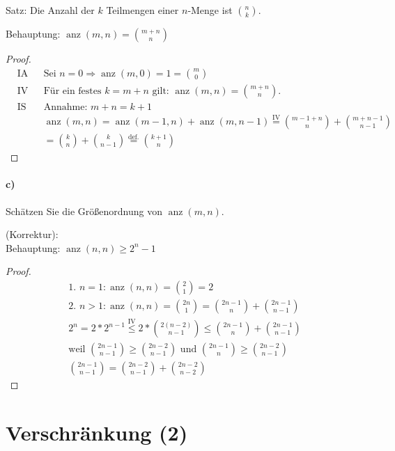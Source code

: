\documentclass[a4paper]{scrartcl}
\DeclareMathOperator{\anz}{anz}
\begin{document}
\begin{center}
Satz: Die Anzahl der $ k $ Teilmengen einer $ n $-Menge ist $ \binom{n}{k} $.
\end{center} 

Behauptung: $ \anz(m, n) = \binom{m + n}{n} $

\begin{proof}
\begin{align*}
& \text{IA} &  & \text{Sei } n = 0 \Rightarrow \anz(m, 0) = 1 = \binom{m}{0}\\
& \text{IV} &  & \text{Für ein festes } k = m + n \text{ gilt: } \anz(m, n) = \binom{m + n}{n}.\\
& \text{IS} &  & \text{Annahme: } m + n = k + 1\\
& {} &  & \anz(m, n) = \anz(m - 1, n) + \anz(m, n - 1) \overset{\text{IV}}{=} \binom{m - 1 + n}{n} + \binom{m + n - 1}{n - 1}\\
& {} &  & = \binom{k}{n} + \binom{k}{n - 1} \overset{\text{def.}}{=} \binom{k + 1}{n}
\end{align*}
\end{proof}

\paragraph{c)} Schätzen Sie die Größenordnung von $ \anz(m, n) $.

(Korrektur):\\
Behauptung: $ \anz(n,n) \geq 2^n - 1$

\begin{proof}
\begin{align*}
& \text{1. } n = 1: \anz(n,n) = \binom{2}{1} = 2 \\
& \text{2. } n > 1: \anz(n,n) = \binom{2n}{1} = \binom{2n-1}{n} + \binom{2n-1}{n-1}\\
& 2^n = 2 * 2^{n-1 } \overset{\text{IV}}{\leq} 2 * \binom{2(n-2)}{n-1} \leq \binom{2n-1}{n} + \binom{2n-1}{n-1}\\
& \text{weil } \binom{2n-1}{n-1} \geq \binom{2n-2}{n-1} \text{ und } \binom{2n-1}{n} \geq \binom{2n-2}{n-1} \\
& \binom{2n-1}{n-1} = \binom{2n-2}{n-1} + \binom{2n-2}{n-2}
\end{align*}
\end{proof}

\section{Verschränkung (2)}
\end{document}
